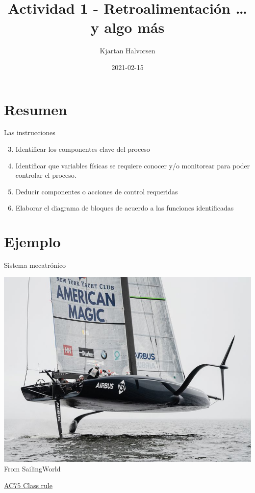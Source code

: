 \documentclass[presentation,aspectratio=169]{beamer}
\author{Kjartan Halvorsen}
\date{2021-02-15}
\title{Actividad 1 - Retroalimentación \ldots{} y algo más}
\begin{document}
\maketitle

\section{Resumen}
\label{sec:org8ffe32d}

\begin{frame}[label={sec:orge524404}]{Las instrucciones}
\begin{enumerate}
\setcounter{enumi}{2}
\item Identificar los \alert{componentes clave} del proceso
\item Identificar que \alert{variables físicas} se requiere conocer y/o monitorear para poder controlar el proceso.
\item Deducir componentes o \alert{acciones de control} requeridas
\item Elaborar el \alert{diagrama de bloques} de acuerdo a las funciones identificadas
\end{enumerate}
\end{frame}



\section{Ejemplo}
\label{sec:org99692d1}
\begin{frame}[label={sec:orgf608373}]{Sistema mecatrónico}
\begin{center}
\includegraphics[height=0.7\textheight]{../../figures/ac75.jpeg}\\
{\footnotesize  From SailingWorld}
\end{center}

\href{https://www.sailingscuttlebutt.com/wp-content/uploads/2018/03/AC75\_Class\_Rule.pdf}{AC75 Class rule}
\end{frame}
\end{document}
